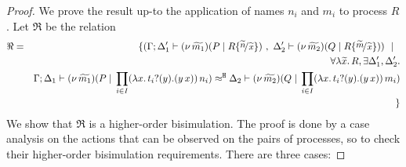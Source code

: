 \begin{proof}
	We prove the result up-to the application
	of names $n_i$ and $m_i$
	to process $R$. %
	Let $\Re$ be the relation
	\begin{eqnarray*}
		\Re	&=&	\set{	(\horel{\Gamma}{\Delta_1'}{\newsp{\widetilde{m_1}}{P \Par R \subst{\widetilde{n}}{\widetilde{x}} }}
						{\ ,\ }
						{\Delta_2'}{\newsp{\widetilde{m_2}}{Q \Par R \subst{\widetilde{m}}{\widetilde{x}} }})
					\setbar\\
					&& \forall \abs{\widetilde{x}}{R}, \exists \Delta_1', \Delta_2'.\\
					&&	\horel{\Gamma}{\Delta_1}{\newsp{\widetilde{m_1}}{P \Par \prod_{i \in I} \appl{(\trvalx{t_i})}{n_i} }}
						{\hwb}
						{\Delta_2}{\newsp{\widetilde{m_2}}{Q \Par \prod_{i \in I} \appl{(\trvalx{t_i})}{m_i}}}\\
				&&}
	\end{eqnarray*}
	We show that $\Re$ is a higher-order bisimulation.
	The proof is done by a case analysis on the actions that can be observed
	on the pairs of processes, so to check their higher-order bisimulation requirements.
	There are three cases:


\end{proof}
